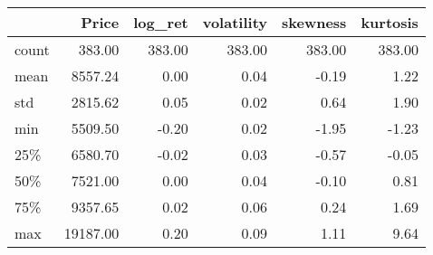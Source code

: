 \begin{tabular}{lrrrrr}
\toprule
{} &    Price &  log\_ret &  volatility &  skewness &  kurtosis \\
\midrule
count &   383.00 &   383.00 &      383.00 &    383.00 &    383.00 \\
mean  &  8557.24 &     0.00 &        0.04 &     -0.19 &      1.22 \\
std   &  2815.62 &     0.05 &        0.02 &      0.64 &      1.90 \\
min   &  5509.50 &    -0.20 &        0.02 &     -1.95 &     -1.23 \\
25\%   &  6580.70 &    -0.02 &        0.03 &     -0.57 &     -0.05 \\
50\%   &  7521.00 &     0.00 &        0.04 &     -0.10 &      0.81 \\
75\%   &  9357.65 &     0.02 &        0.06 &      0.24 &      1.69 \\
max   & 19187.00 &     0.20 &        0.09 &      1.11 &      9.64 \\
\bottomrule
\end{tabular}
